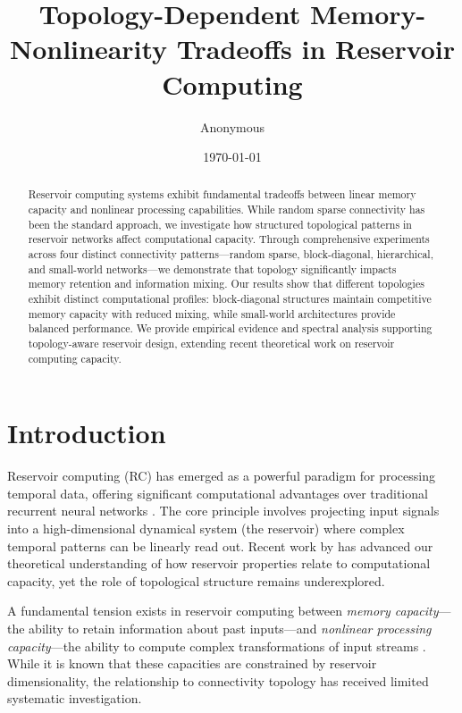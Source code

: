 \documentclass[11pt]{article}
\title{Topology-Dependent Memory-Nonlinearity Tradeoffs in Reservoir Computing}
\author{Anonymous}
\date{\today}
\begin{document}
\maketitle

\begin{abstract}
Reservoir computing systems exhibit fundamental tradeoffs between linear memory capacity and nonlinear processing capabilities. While random sparse connectivity has been the standard approach, we investigate how structured topological patterns in reservoir networks affect computational capacity. Through comprehensive experiments across four distinct connectivity patterns---random sparse, block-diagonal, hierarchical, and small-world networks---we demonstrate that topology significantly impacts memory retention and information mixing. Our results show that different topologies exhibit distinct computational profiles: block-diagonal structures maintain competitive memory capacity with reduced mixing, while small-world architectures provide balanced performance. We provide empirical evidence and spectral analysis supporting topology-aware reservoir design, extending recent theoretical work on reservoir computing capacity.
\end{abstract}

\section{Introduction}

Reservoir computing (RC) has emerged as a powerful paradigm for processing temporal data, offering significant computational advantages over traditional recurrent neural networks \citep{jaeger2001echo, maass2002real}. The core principle involves projecting input signals into a high-dimensional dynamical system (the reservoir) where complex temporal patterns can be linearly read out. Recent work by \citet{hart2024thesis} has advanced our theoretical understanding of how reservoir properties relate to computational capacity, yet the role of topological structure remains underexplored.

A fundamental tension exists in reservoir computing between \emph{memory capacity}---the ability to retain information about past inputs---and \emph{nonlinear processing capacity}---the ability to compute complex transformations of input streams \citep{dambre2012information}. While it is known that these capacities are constrained by reservoir dimensionality, the relationship to connectivity topology has received limited systematic investigation.
\end{document}
